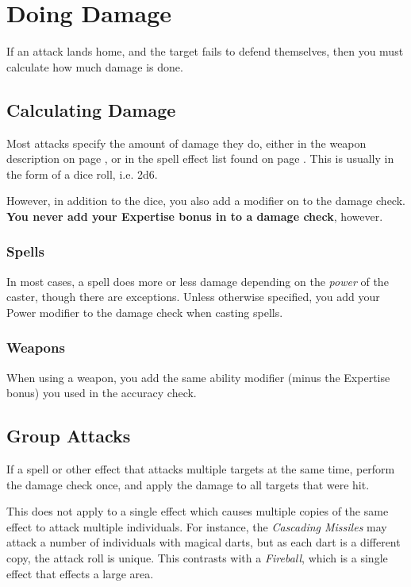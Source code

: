 \section{Doing Damage} \label{S:Damage}

If an attack lands home, and the target fails to defend themselves, then you must calculate how much damage is done.

\subsection{Calculating Damage}

Most attacks specify the amount of damage they do, either in the weapon description on page \pageref{S:WeaponList}, or in the spell effect list found on page \pageref{S:SpellList}. This is usually in the form of a dice roll, i.e. 2d6.

However, in addition to the dice, you also add a modifier on to the damage check. {\bf You never add your Expertise bonus in to a damage check}, however. 

\subsubsection{Spells}

In most cases, a spell does more or less damage depending on the {\it power} of the caster, though there are exceptions. Unless otherwise specified, you add your Power modifier to the damage check when casting spells. 

\subsubsection{Weapons}

When using a weapon, you add the same ability modifier (minus the Expertise bonus) you used in the accuracy check. 

\subsection{Group Attacks}

If a spell or other effect that attacks multiple targets at the same time, perform the damage check once, and apply the damage to all targets that were hit. 

This does not apply to a single effect which causes multiple copies of the same effect to attack multiple individuals. For instance, the {\it Cascading Missiles} may attack a number of individuals with magical darts, but as each dart is a different copy, the attack roll is unique. This contrasts with a {\it Fireball}, which is a single effect that effects a large area. 

